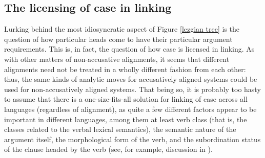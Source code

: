 \documentclass[output=paper
	        ,collection
	        ,collectionchapter
 	        ,biblatex
                ,babelshorthands
                ,newtxmath
                ,draftmode
                ,colorlinks, citecolor=brown
]{langscibook}
\begin{document}
\subsection{The licensing of case in linking}
 
Lurking behind the most idiosyncratic aspect of Figure \ref{lezgian tree} is the question of  how particular heads come to have their particular argument requirements. This is, in fact,  the question of how case is licensed in linking. As with other matters of non-accusative alignments, it seems that different alignments need not be treated in a wholly different fashion from each other: thus, the same kinds of analytic moves for accusatively aligned systems could be used for non-accusatively aligned systems. That being so, it is probably too hasty to assume that there is a one-size-fits-all solution for linking of case across all languages (regardless of alignment), as quite a few different factors appear to be important in different languages, among them at least verb class (that is, the classes related to the verbal lexical semantics), the semantic nature of the argument itself, the morphological form of the verb, and the subordination status of the clause headed by the verb (see, for example, discussion in \citealt{dixon94}).     
\end{document}
